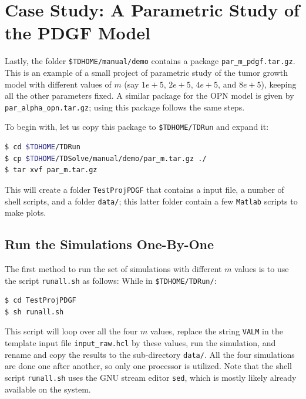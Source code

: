 \documentclass{amsproc}
\theoremstyle{definition}
\theoremstyle{remark}
\numberwithin{equation}{section}
\numberwithin{figure}{section}
\begin{document}
\section{Case Study: A Parametric Study of the PDGF Model}
Lastly, the folder \texttt{\$TDHOME/manual/demo} contains a package \texttt{par\_m\_pdgf.tar.gz}.
This is an example of a small project of parametric study of the tumor growth model with different values of $m$ (say $1e+5$, $2e+5$, $4e+5$, and $8e+5$), keeping all the other parameters fixed.
A similar package for the OPN model is given by \texttt{par\_alpha\_opn.tar.gz}; using this package follows the same steps.

To begin with, let us copy this package to \texttt{\$TDHOME/TDRun} and expand it:
\begin{lstlisting}[backgroundcolor = \color{lightgray}, language = bash, xleftmargin = 0.1cm, framexleftmargin = 0.0cm]
$ cd $TDHOME/TDRun
$ cp $TDHOME/TDSolve/manual/demo/par_m.tar.gz ./
$ tar xvf par_m.tar.gz
\end{lstlisting}
This will create a folder \texttt{TestProjPDGF} that contains a input file, a number of shell scripts, and a folder \texttt{data/}; this latter folder contain a few \texttt{Matlab} scripts to make plots.

\subsection{Run the Simulations One-By-One}
The first method to run the set of simulations with different $m$ values is to use the script \texttt{runall.sh} as follows: While in \texttt{\$TDHOME/TDRun/}:
\begin{lstlisting}[backgroundcolor = \color{lightgray}, language = bash, xleftmargin = 0.1cm, framexleftmargin = 0.0cm]
$ cd TestProjPDGF
$ sh runall.sh
\end{lstlisting}
This script will loop over all the four $m$ values, replace the string \texttt{VALM} in the template input file \texttt{input\_raw.hcl} by these values, run the simulation, and rename and copy the results to the sub-directory \texttt{data/}.
All the four simulations are done one after another, so only one processor is utilized.
Note that the shell script \texttt{runall.sh} uses the GNU stream editor \texttt{sed}, which is mostly likely already available on the system.
\end{document}
